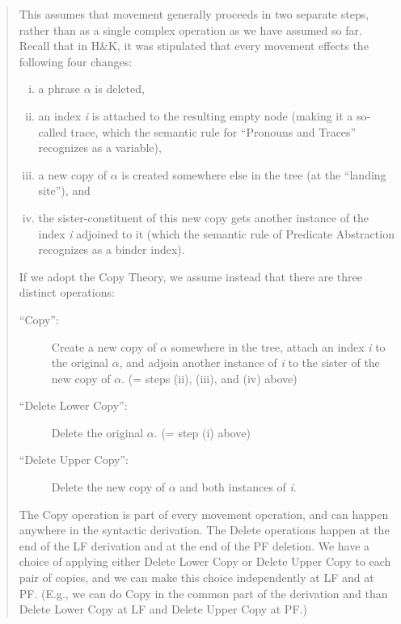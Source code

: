 \begin{quote}
  \begin{small}
    This assumes that movement generally
    proceeds in two separate steps, rather than as a single complex operation as we
    have assumed so far. Recall that in H\&K, it was stipulated that every
    movement effects the following four changes:

    \begin{enumerate}
      [(i)]
      \item a phrase $\alpha$ is deleted,
      \item an index \emph{i} is attached to the resulting empty node (making it a
      so-called trace, which the semantic rule for ``Pronouns and Traces''
      recognizes as a variable),
      \item a new copy of $\alpha$ is created somewhere else in the tree (at the
      ``landing site''), and
      \item the sister-constituent of this new copy gets another instance of the index
      \emph{i} adjoined to it (which the semantic rule of Predicate Abstraction
      recognizes as a binder index).
    \end{enumerate}

    If we adopt the Copy Theory, we assume instead that there are three distinct
    operations:

    \begin{description}

      \item[``Copy'':] Create a new copy of $\alpha$ somewhere in the tree, attach an
            index \emph{i} to the original $\alpha$, and adjoin another instance of
            \emph{i} to the sister of the new copy of $\alpha$. (= steps (ii), (iii), and
            (iv) above)

      \item[``Delete Lower Copy'':] Delete the original $\alpha$. (= step (i) above)

      \item[``Delete Upper Copy'':] Delete the new copy of $\alpha$ and both instances
            of \emph{i}.
    \end{description}
    The Copy operation is part of every movement operation, and can happen anywhere
    in the syntactic derivation. The Delete operations happen at the end of the LF
    derivation and at the end of the PF deletion. We have a choice of applying
    either Delete Lower Copy or Delete Upper Copy to each pair of copies, and we can
    make this choice independently at LF and at PF. (E.g., we can do Copy in the
    common part of the derivation and than Delete Lower Copy at LF and Delete Upper
    Copy at PF.)
  \end{small}
\end{quote}

